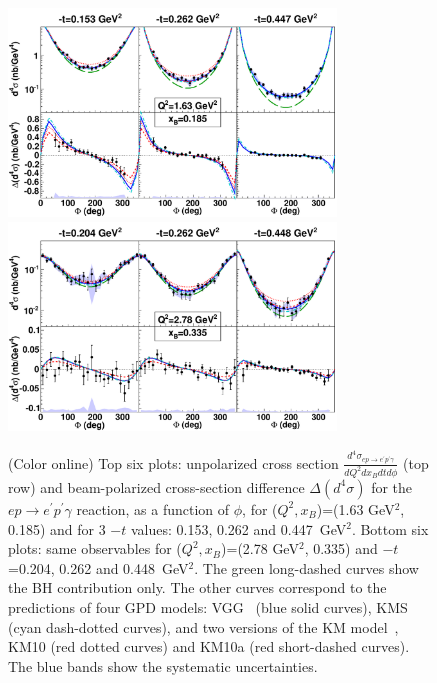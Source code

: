 \documentclass[nofootinbib,twocolumn,showpacs,prl,superscriptaddress,secnumarabic,amssymb,nobibnotes,aps,floatfix]{revtex4-1}
\begin{document}
\begin{figure}[htb]
\includegraphics[width=8.7cm]{fig4a.pdf}
\includegraphics[width=8.7cm]{fig4b.pdf}
\vspace{-0.5cm}
\caption{(Color online) Top six plots: unpolarized cross section 
$\frac{d^4 \sigma_{ep\to e^\prime p^\prime \gamma}}{dQ^2 dx_B dt d\phi}$ (top row)
and beam-polarized cross-section difference $\Delta(d^4\sigma)$ for the
$ep\to e^\prime p^\prime \gamma$ reaction, as a function of $\phi$,
for ($Q^2,x_B$)=(1.63 GeV$^2$, 0.185) and for 3 $-t$ values: 0.153, 0.262 and 0.447~GeV$^2$.
Bottom six plots: same observables for ($Q^2,x_B$)=(2.78 GeV$^2$, 0.335) and 
$-t$=0.204, 0.262 and 0.448~GeV$^2$.
The green long-dashed curves show the BH contribution only.
The other curves correspond to the predictions of four GPD models:
VGG~\cite{Vanderhaeghen:1998uc1999xj,Goeke:2001tz,Guidal:2004nd} 
(blue solid curves), KMS~\cite{KMS} (cyan dash-dotted curves),
and two versions of the KM model~\cite{Kumericki:2009uq,Kumericki:2011zc},
KM10 (red dotted curves) and KM10a (red short-dashed curves). The blue bands show the
systematic uncertainties.}
\label{fig:xsec}
\end{figure}
\end{document}
